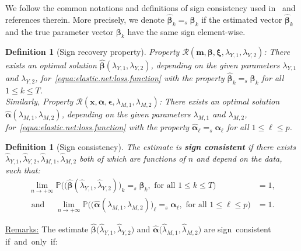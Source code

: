\documentclass[
  12pt]{article}
\newtheorem{definition}[thm]{Definition}
\def\M{\mathbf{m}}
\def\X{\mathbf{x}}
\begin{document}
We follow the common notations and definitions of sign consistency used  in~\citep{Jia-Yu:2010:model.consistency.elastic-net} and references therein. More precisely,
we denote $\widehat{\bm{\beta}}_{k} =_{s} \bm{\beta}_{k}$ if the estimated vector  $\widehat{\bm{\beta}}_{k}$ and the true parameter vector $\bm{\beta}_{k}$ have the same sign element-wise.
\begin{definition}[Sign recovery property]  \em{
		Property $\mathcal{R}(\M, \bm{\beta}, \bm{\xi}, \lambda_{Y,1}, \lambda_{Y,2})$: There exists an optimal solution $\widehat{\bm{\beta}}(\lambda_{Y,1}, \lambda_{Y,2})$, depending on the given parameters $\lambda_{Y,1}$ and $\lambda_{Y,2}$, for~\eqref{equa:elastic.net:loss.function} with the property $\widehat{\bm{\beta}}_{k} =_{s} \bm{\beta}_{k}$ for all $1 \leq k \leq T$.
\leavevmode \\
Similarly, 	Property $\mathcal{R}(\X, \bm{\alpha}, \bm{\epsilon}, \lambda_{M,1}, \lambda_{M,2})$: There exists an optimal solution $\widehat{\bm{\alpha}}(\lambda_{M,1}, \lambda_{M,2})$, depending on the given parameters $\lambda_{M,1}$ and $\lambda_{M,2}$, for~\eqref{equa:elastic.net:loss.function} with the property $\widehat{\bm{\alpha}}_{\ell} =_{s} \bm{\alpha}_{\ell}$ for all $1 \leq \ell \leq p$.
}  \end{definition}
\begin{definition}[Sign consistency]  \em{
		The estimate is \textbf{sign consistent} if there exists $\widehat{\lambda}_{Y,1}, \widehat{\lambda}_{Y,2}, \widehat{\lambda}_{M,1}, \widehat{\lambda}_{M,2}$ both of which are functions of $n$ and depend on the data, such that:
		\begin{align*}
			\lim_{n   \rightarrow   +\infty}    \mathbb{P} \Big( \big( \widehat{\bm{\beta}} (\widehat{\lambda}_{Y,1} , \widehat{\lambda}_{Y,2})\big)_{k}  =_{s}   \bm{\beta}_{k} , \textrm{ for all } 1 \leq k \leq T  \Big)  &=   1 ,
            \\
            \textrm{ and }\quad \lim_{n   \rightarrow   +\infty}    \mathbb{P} \Big( \big( \widehat{\bm{\alpha}} (\widehat{\lambda}_{M,1} , \widehat{\lambda}_{M,2})\big)_{\ell}  =_{s}   \bm{\alpha}_{\ell} , \textrm{ for all } 1 \leq \ell \leq p  \Big)  &=   1.
		\end{align*}
}  \end{definition}
\underline{Remarks:} 
The estimate $\widehat{\bm{\beta}} \big( \widehat{\lambda}_{Y,1} , \widehat{\lambda}_{Y,2}   \big)$ and $\widehat{\bm{\alpha}} \big( \widehat{\lambda}_{M,1} , \widehat{\lambda}_{M,2}   \big)$ are  sign~consistent if~and~only~if:
\end{document}
